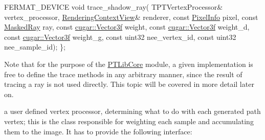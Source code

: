 \begin{DoxyParagraph}{}
\begin{DoxyEnumerate}
\begin{DoxyCode}
  FERMAT\_DEVICE
  \textcolor{keywordtype}{void} trace\_shadow\_ray(
      TPTVertexProcessor&     vertex\_processor,
      \hyperlink{struct_rendering_context_view}{RenderingContextView}&   renderer,
      \textcolor{keyword}{const} \hyperlink{union_pixel_info}{PixelInfo}         pixel,
      \textcolor{keyword}{const} \hyperlink{struct_masked_ray}{MaskedRay}         ray,
      \textcolor{keyword}{const} \hyperlink{structcugar_1_1_vector}{cugar::Vector3f}   weight,
      \textcolor{keyword}{const} \hyperlink{structcugar_1_1_vector}{cugar::Vector3f}   weight\_d,
      \textcolor{keyword}{const} \hyperlink{structcugar_1_1_vector}{cugar::Vector3f}   weight\_g,
      \textcolor{keyword}{const} uint32            nee\_vertex\_id,
      \textcolor{keyword}{const} uint32            nee\_sample\_id);
\};
\end{DoxyCode}
 Note that for the purpose of the \hyperlink{group___p_t_lib_core}{P\+T\+Lib\+Core} module, a given implementation is free to define the trace methods in any arbitrary manner, since the result of tracing a ray is not used directly. This topic will be covered in more detail later on. ~\newline
~\newline
\label{_p_t_lib_page_TPTVertexProcessor}%
%

\item a user defined vertex processor, determining what to do with each generated path vertex; this is the class responsible for weighting each sample and accumulating them to the image. It has to provide the following interface\+: ~\newline


\end{DoxyEnumerate}
\end{DoxyParagraph}

